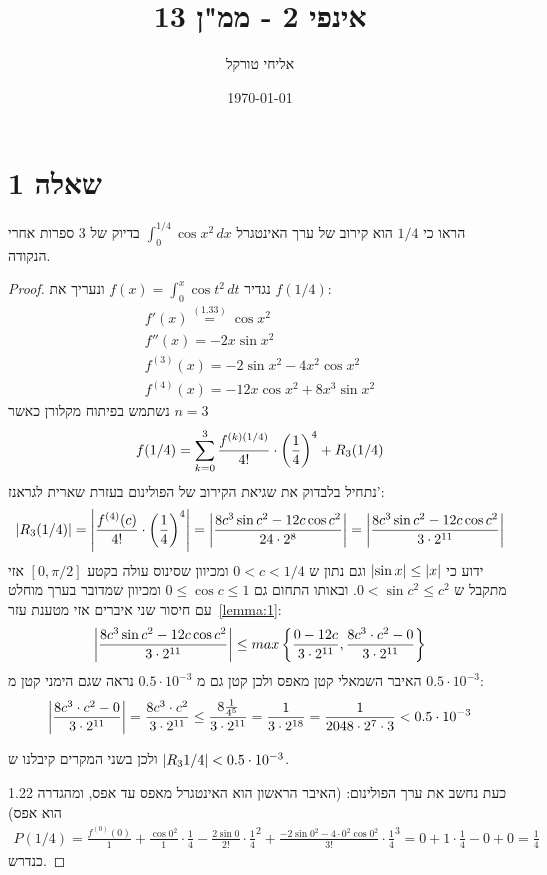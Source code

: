 \documentclass{article}
\title{אינפי 2 - ממ"ן 13}
\author{אליחי טורקל \ID}
\date\today
\begin{document}
	\maketitle %


	\section*{שאלה 1}
	הראו כי $1/4$ הוא קירוב של ערך האינטגרל $\int_0^{1/4} \cos x^2 \, dx$ בדיוק של 3 ספרות אחרי הנקודה.

	\begin{proof}
		נגדיר $f(x) = \int_0^x \cos t^2 \, dt$ ונעריך את $f(1/4)$:
		\begin{align*}
			f'(x) \overset{(1.33)}= \cos x^2 \\
			f''(x) = -2x \sin x^2 \\
			f^{(3)}(x) = -2\sin x^2 -4x^2 \cos x^2 \\
			f^{(4)}(x) = -12 x \cos x^2 + 8x^3 \sin x^2
		\end{align*}
		נשתמש בפיתוח מקלורן כאשר $n=3$
		\begin{align*}
			f(1/4) = \sum^3_{k=0} \frac{f^{(k)(1/4)}}{4!} \cdot \left( \frac{1}{4} \right)^4 + R_3(1/4)
		\end{align*}
		נתחיל בלבדוק את שגיאת הקירוב של הפולינום בעזרת שארית לגראנז':
		\begin{align*}
			\left| R_3(1/4) \right| = \left| \frac{f^{(4)}(c)}{4!} \cdot \left( \frac{1}{4} \right)^4 \right|
			= \left| \frac{8c^3 \sin c^2 - 12c \cos c^2}{24 \cdot 2^8} \right|
			= \left| \frac{8c^3 \sin c^2 - 12c \cos c^2}{3 \cdot 2^{11}} \right|
		\end{align*}
		ידוע כי $\left| \sin x \right| \leq \left| x \right|$ וגם נתון ש $0 < c < 1/4$ ומכיוון שסינוס עולה בקטע $[0, \pi/2]$
		אזי מתקבל ש $0 < \sin c^2 \leq c^2$.
		ובאותו התחום גם $0 \leq \cos c \leq 1$ ומכיוון שמדובר בערך מוחלט עם חיסור שני איברים אזי מטענת עזר~\ref{lemma:1}:
		\begin{align*}
			\left| \frac{8c^3 \sin c^2 - 12 c \cos c^2}{3 \cdot 2^{11}} \right| \leq
			max \left\{
				 \frac{0 - 12c}{3 \cdot 2^{11}},
				 \frac{8c^3 \cdot c^2 - 0}{3 \cdot 2^{11}}
				 \right\}
		\end{align*}
		האיבר השמאלי קטן מאפס ולכן קטן גם מ $0.5 \cdot 10^{-3}$ נראה שגם הימני קטן מ $0.5 \cdot 10^{-3}$:
		\begin{align*}
			\left| \frac{8c^3 \cdot c^2 - 0}{3 \cdot 2^{11}} \right|
			= \frac{8c^3 \cdot c^2}{3 \cdot 2^{11}}
			\leq \frac{8 \frac{1}{4^5}}{3 \cdot 2^{11}}
			= \frac{1}{3 \cdot 2^{18}}
			= \frac{1}{2048 \cdot 2^7 \cdot 3}
			< 0.5 \cdot 10^{-3}
		\end{align*}

		ולכן בשני המקרים קיבלנו ש $\left| R_3{1/4} \right| < 0.5 \cdot 10^{-3}$.

		כעת נחשב את ערך הפולינום: (האיבר הראשון הוא האינטגרל מאפס עד אפס, ומהגדרה 1.22 הוא אפס)
		\begin{align*}
			P(1/4)
			= \frac{f^{(0)}(0)}{1} + \frac{\cos 0^2}{1}\cdot\frac{1}{4} - \frac{2\sin 0}{2!} \cdot\frac{1}{4}^2 + \frac{-2 \sin 0^2 -4 \cdot 0^2 \cos 0^2}{3!} \cdot\frac{1}{4}^3
			= 0 + 1 \cdot \frac{1}{4} - 0 + 0 = \frac{1}{4}
		\end{align*}
		כנדרש.
	\end{proof}
\end{document}
